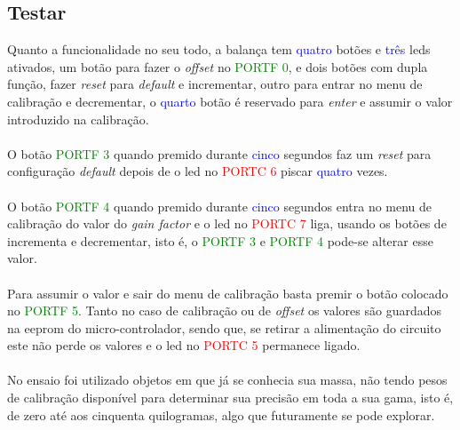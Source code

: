 \subsection{Testar}
Quanto a funcionalidade no seu todo, a balança tem \textcolor{blue}{quatro} botões e \textcolor{blue}{três} \acsp{led} ativados, um botão para fazer o \textit{offset} no \textcolor{green}{PORTF 0}, e dois botões com dupla função, fazer \textit{reset} para \textit{default} e incrementar, outro para entrar no menu de calibração e decrementar, o \textcolor{blue}{quarto} botão é reservado para \textit{enter} e assumir o valor introduzido na calibração.\\
\\
O botão \textcolor{green}{PORTF 3} quando premido durante \textcolor{blue}{cinco} segundos faz um \textit{reset} para configuração \textit{default} depois de o \acs{led} no \textcolor{red}{PORTC 6} piscar \textcolor{blue}{quatro} vezes.\\
\\
O botão \textcolor{green}{PORTF 4} quando premido durante \textcolor{blue}{cinco} segundos entra no menu de calibração do valor do \textit{gain factor} e o \acs{led} no \textcolor{red}{PORTC 7} liga, usando os botões de incrementa e decrementar, isto é, o
\textcolor{green}{PORTF 3} e \textcolor{green}{PORTF 4} pode-se alterar esse valor.\\
\\
Para assumir o valor e sair do menu de calibração basta premir o botão colocado no \textcolor{green}{PORTF 5}. Tanto no caso de calibração ou de \textit{offset} os valores são guardados na \acs{eeprom} do micro-controlador, sendo que, se retirar a alimentação do circuito este não perde os valores e o \acs{led} no \textcolor{red}{PORTC 5} permanece ligado.
\\
\\
No ensaio foi utilizado objetos em que já se conhecia sua massa, não tendo pesos de calibração disponível para determinar sua precisão em toda a sua gama, isto é, de zero até aos cinquenta quilogramas, algo que futuramente se pode explorar.
